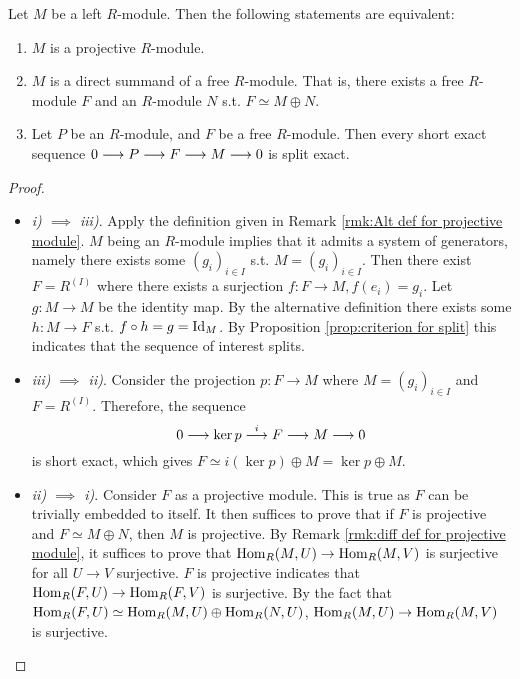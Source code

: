 \documentclass{article}
\begin{document}
\begin{proposition}\label{prop:criterion for projective module}
    Let $M$ be a left $R$-module. Then the following statements are equivalent:
    \begin{enumerate}[label=\roman*)]
        \item $M$ is a projective $R$-module.
        \item $M$ is a direct summand of a free $R$-module. That is, there exists a free $R$-module $F$ and an $R$-module $N$ s.t. $F \simeq M \oplus N$.
        \item Let $P$ be an $R$-module, and $F$ be a free $R$-module. Then every short exact sequence $0 \longrightarrow P \longrightarrow F \longrightarrow M \longrightarrow 0$ is split exact.
    \end{enumerate}
\end{proposition}

\begin{proof}\ 
    \begin{itemize}
        \item \emph{i) $\implies$ iii)}. Apply the definition given in Remark \ref{rmk:Alt def for projective module}. $M$ being an $R$-module implies that it admits a system of generators, namely there exists some $(g_i)_{i\in I}$ s.t. $M = (g_i)_{i\in I}$. Then there exist $F = R^{(I)}$ where there exists a surjection $f: F \to M, f(e_i) = g_i$. Let $g: M \to M$ be the identity map. By the alternative definition there exists some $h: M \to F$ s.t. $f \circ h = g = \mathrm{Id}_M$. By Proposition \ref{prop:criterion for split} this indicates that the sequence of interest splits.
        \item \emph{iii) $\implies$ ii)}. Consider the projection $p: F \to M$ where $M = (g_i)_{i\in I}$ and $F = R^{(I)}$. Therefore, the sequence
        \[
            0 \longrightarrow \ker p \overset{i}{\longrightarrow} F \longrightarrow M \longrightarrow 0
        \]
        is short exact, which gives $F \simeq i(\ker p) \oplus M = \ker p \oplus M$.
        \item \emph{ii) $\implies$ i)}. Consider $F$ as a projective module. This is true as $F$ can be trivially embedded to itself. It then suffices to prove that if $F$ is projective and $F \simeq M \oplus N$, then $M$ is projective. By Remark \ref{rmk:diff def for projective module}, it suffices to prove that $\mathrm{Hom}_R(M, U) \to \mathrm{Hom}_R(M, V)$ is surjective for all $U \to V$ surjective. $F$ is projective indicates that $\mathrm{Hom}_R(F, U) \to \mathrm{Hom}_R(F, V)$ is surjective. By the fact that $\mathrm{Hom}_R(F, U) \simeq \mathrm{Hom}_R(M, U) \oplus \mathrm{Hom}_R(N, U)$, $\mathrm{Hom}_R(M, U) \to \mathrm{Hom}_R(M, V)$ is surjective.
    \end{itemize}
\end{proof}
\end{document}
